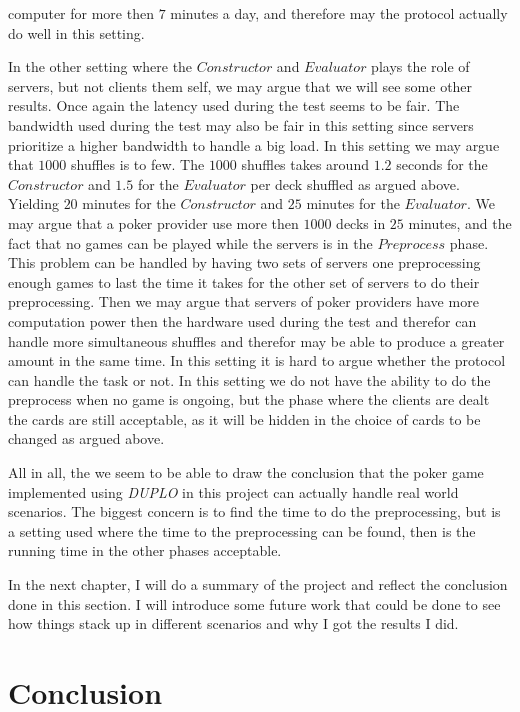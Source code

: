 \documentclass[twoside,11pt,openright]{report}
\newcommand{\DUPLO}{\textit{DUPLO} }
\begin{document}
computer for more then $7$ minutes a day, and therefore may the protocol actually do well in this setting.

In the other setting where the $Constructor$ and $Evaluator$ plays the role of servers, but not clients them self, we may argue that we will see some other results. Once again the latency used during the test seems to be fair. The bandwidth used during the test may also be fair in this setting since servers prioritize a higher bandwidth to handle a big load. In this setting we may argue that $1000$ shuffles is to few.  The $1000$ shuffles takes around $1.2$ seconds for the $Constructor$ and $1.5$ for the $Evaluator$ per deck shuffled as argued above. Yielding $20$ minutes for the $Constructor$ and $25$ minutes for the $Evaluator$. We may argue that a poker provider use more then $1000$ decks in $25$ minutes, and the fact that no games can be played while the servers is in the $Preprocess$ phase. This problem can be handled by having two sets of servers one preprocessing enough games to last the time it takes for the other set of servers to do their preprocessing. Then we may argue that servers of poker providers have more computation power then the hardware used during the test and therefor can handle more simultaneous shuffles and therefor may be able to produce a greater amount in the same time. In this setting it is hard to argue whether the protocol can handle the task or not. In this setting we do not have the ability to do the preprocess when no game is ongoing, but the phase where the clients are dealt the cards are still acceptable, as it will be hidden in the choice of cards to be changed as argued above.

\bigskip

All in all, the we seem to be able to draw the conclusion that the poker game implemented using \DUPLO in this project can actually handle real world scenarios. The biggest concern is to find the time to do the preprocessing, but is a setting used where the time to the preprocessing can be found, then is the running time in the other phases acceptable.

In the next chapter, I will do a summary of the project and reflect the conclusion done in this section. I will introduce some future work that could be done to see how things stack up in different scenarios and why I got the results I did.


\chapter{Conclusion}
\label{ch:conclution}
\end{document}

